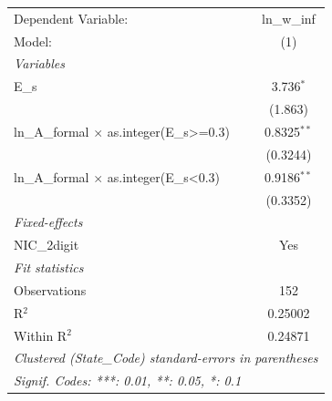 
\begingroup
\centering
\begin{tabular}{lc}
   \tabularnewline \midrule \midrule
   Dependent Variable:                              & ln\_w\_inf\\    
   Model:                                           & (1)\\  
   \midrule
   \emph{Variables}\\
   E\_s                                             & 3.736$^{*}$\\   
                                                    & (1.863)\\   
   ln\_A\_formal $\times$ as.integer(E\_s>=0.3)     & 0.8325$^{**}$\\   
                                                    & (0.3244)\\   
   ln\_A\_formal $\times$ as.integer(E\_s<0.3)      & 0.9186$^{**}$\\   
                                                    & (0.3352)\\   
   \midrule
   \emph{Fixed-effects}\\
   NIC\_2digit                                      & Yes\\  
   \midrule
   \emph{Fit statistics}\\
   Observations                                     & 152\\  
   R$^2$                                            & 0.25002\\  
   Within R$^2$                                     & 0.24871\\  
   \midrule \midrule
   \multicolumn{2}{l}{\emph{Clustered (State\_Code) standard-errors in parentheses}}\\
   \multicolumn{2}{l}{\emph{Signif. Codes: ***: 0.01, **: 0.05, *: 0.1}}\\
\end{tabular}
\par\endgroup



